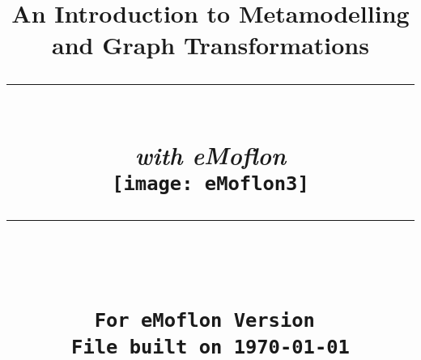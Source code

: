 \title{
\flushright
{\LARGE\bfseries An Introduction to Metamodelling\\
and Graph Transformations}
\noindent\rule[-1ex]{\textwidth}{5pt}\\[2.5ex]
\hfill\emph{\LARGE\bfseries with eMoflon}\\
\center
\texttt{[image: eMoflon3]}
\flushleft
\noindent\rule[-1ex]{0.5\textwidth}{1.5pt}\\[1.5 ex]
{\Large\bfseries \partTitle}\\
{\small \texttt{For eMoflon Version \versionNumber}}\\
{\small \texttt{File built on \today}}\\
}

\date{}  
\author{} 
